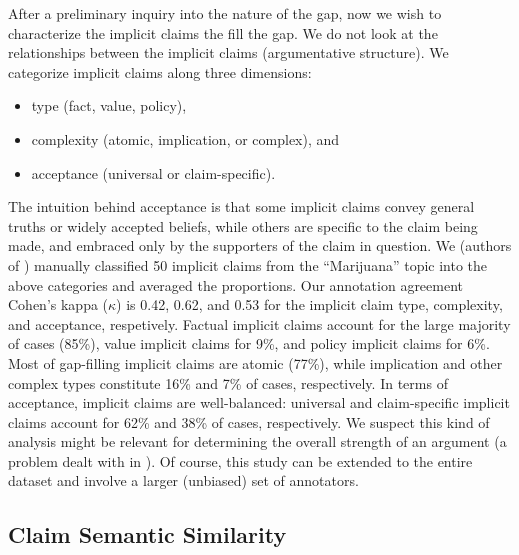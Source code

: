 After a preliminary inquiry into the nature of the gap, 
now we wish to characterize the implicit claims the fill the gap. 
We do not look at the relationships between the implicit claims (argumentative
structure). 
We categorize implicit claims along three dimensions: 
\begin{itemize}
\item type (fact, value, policy), 
\item complexity (atomic, implication, or complex), and
\item acceptance (universal or claim-specific).
\end{itemize}
The intuition behind acceptance is that some implicit claims convey general truths or widely
accepted beliefs, while others are specific to the claim being made, and embraced
only by the supporters of the claim in question. 
We (authors of \citep{boltuzic2016fill}) manually classified 50 implicit claims
from the ``Marijuana''
topic into the above categories and averaged the proportions. 
Our annotation agreement Cohen's kappa ($\kappa$) \citep{cohen1960coefficient} is 0.42, 
0.62, and 0.53 for the implicit claim type, complexity, and acceptance, respetively.
Factual implicit claims account for the large majority of cases (85\%), value implicit claims
for 9\%, and policy implicit claims for 6\%.
Most of gap-filling implicit claims are atomic (77\%), while implication and other complex
types constitute 16\% and 7\% of cases, respectively.
In terms of acceptance, implicit claims are well-balanced: universal and claim-specific 
implicit claims account for 62\% and 38\% of cases, respectively. 
We suspect this kind of analysis might be relevant for determining the overall 
strength of an argument (a problem dealt with in \citep{park2014identifying}). 
Of course, this study can be extended to the entire dataset and involve
a larger (unbiased) set of annotators. 

\subsection{Claim Semantic Similarity}

